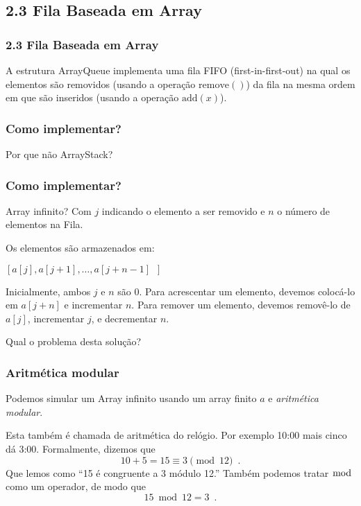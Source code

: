 \documentclass{beamer}
\begin{document}
\subsection{2.3 Fila Baseada em Array}
\begin{frame}
\frametitle{2.3 Fila Baseada em Array}
A estrutura ArrayQueue implementa uma fila FIFO (first-in-first-out) na qual os elementos são removidos (usando
a operação $\ensuremath{\ensuremath{\mathrm{remove}()}}$) da fila na mesma ordem em que são inseridos (usando a operação $\ensuremath{\ensuremath{\mathrm{add}(\ensuremath{\mathit{x}})}}$).


\end{frame}

\begin{frame}
\frametitle{Como implementar?}

Por que não ArrayStack?

\end{frame}

\begin{frame}
\frametitle{Como implementar?}

Array infinito? Com $j$ indicando o elemento a ser removido e $n$ o número de elementos na Fila.


Os elementos são armazenados em:

$[a[j],a[j+1],\ldots,a[j+n-1] \enspace]$

Inicialmente, ambos $j$ e $n$ são 0.  Para acrescentar um elemento, devemos colocá-lo em $a[j+n]$ e incrementar $\ensuremath{\ensuremath{\ensuremath{\mathit{n}}}}$.
Para remover um elemento, devemos removê-lo de $\ensuremath{\ensuremath{\ensuremath{\mathit{a}}[\ensuremath{\mathit{j}}]}}$, incrementar $\ensuremath{\ensuremath{\ensuremath{\mathit{j}}}}$, e
decrementar $\ensuremath{\ensuremath{\ensuremath{\mathit{n}}}}$.

\end{frame}

\begin{frame}
Qual o problema desta solução?

\end{frame}

\begin{frame}
\frametitle{Aritmética modular}

 Podemos simular um Array infinito usando um array finito $a$
e \emph{aritmética modular}.

Esta também é chamada de aritmética do relógio.  Por exemplo 10:00 mais cinco dá 3:00.  Formalmente, dizemos que
\[
    10 + 5 = 15 \equiv 3 \pmod{12} \enspace .
\]
Que lemos como ``15 é congruente a 3 módulo
12.'' Também podemos tratar $\bmod$ como um operador, de modo que
\[
   15 \bmod 12 = 3 \enspace .
\]

\end{frame}
\end{document}
